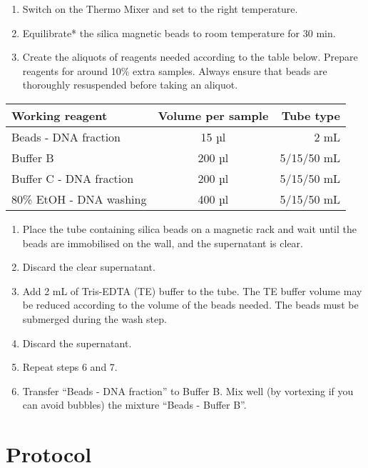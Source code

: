 \documentclass[
]{book}
\providecommand{\tightlist}{%
  \setlength{\itemsep}{0pt}\setlength{\parskip}{0pt}}
\begin{document}
\begin{enumerate}
\def\labelenumi{\arabic{enumi}.}
\tightlist
\item
  Switch on the Thermo Mixer and set to the right temperature.
\item
  Equilibrate* the silica magnetic beads to room temperature for 30 min.
\item
  Create the aliquots of reagents needed according to the table below. Prepare reagents for around 10\% extra samples. Always ensure that beads are thoroughly resuspended before taking an aliquot.
\end{enumerate}

\begin{longtable}[]{@{}lcr@{}}
\toprule\noalign{}
Working reagent & Volume per sample & Tube type \\
\midrule\noalign{}
\endhead
\bottomrule\noalign{}
\endlastfoot
Beads - DNA fraction & 15 µl & 2 mL \\
Buffer B & 200 µl & 5/15/50 mL \\
Buffer C - DNA fraction & 200 µl & 5/15/50 mL \\
80\% EtOH - DNA washing & 400 µl & 5/15/50 mL \\
\end{longtable}

\begin{enumerate}
\def\labelenumi{\arabic{enumi}.}
\setcounter{enumi}{3}
\tightlist
\item
  Place the tube containing silica beads on a magnetic rack and wait until the beads are immobilised on the wall, and the supernatant is clear.
\item
  Discard the clear supernatant.
\item
  Add 2 mL of Tris-EDTA (TE) buffer to the tube. The TE buffer volume may be reduced according to the volume of the beads needed. The beads must be submerged during the wash step.
\item
  Discard the supernatant.
\item
  Repeat steps 6 and 7.
\item
  Transfer ``Beads - DNA fraction'' to Buffer B. Mix well (by vortexing if you can avoid bubbles) the mixture ``Beads - Buffer B''.
\end{enumerate}

\hypertarget{protocol-1}{%
\section{Protocol}\label{protocol-1}}
\end{document}
